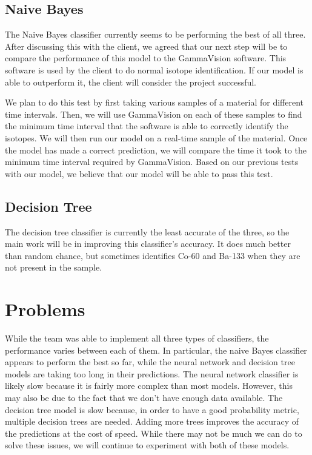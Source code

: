 \documentclass[onecolumn, draftclsnofoot,10pt, compsoc]{IEEEtran}
\begin{document}
\subsection{Naive Bayes}
The Naive Bayes classifier currently seems to be performing the best of all three.
After discussing this with the client, we agreed that our next step will be to compare the performance of this model to the GammaVision software.
This software is used by the client to do normal isotope identification.
If our model is able to outperform it, the client will consider the project successful.

We plan to do this test by first taking various samples of a material for different time intervals.
Then, we will use GammaVision on each of these samples to find the minimum time interval that the software is able to correctly identify the isotopes.
We will then run our model on a real-time sample of the material.
Once the model has made a correct prediction, we will compare the time it took to the minimum time interval required by GammaVision.
Based on our previous tests with our model, we believe that our model will be able to pass this test.

\subsection{Decision Tree}
The decision tree classifier is currently the least accurate of the three, so the main work will be in improving this classifier's accuracy. 
It does much better than random chance, but sometimes identifies Co-60 and Ba-133 when they are not present in the sample.

\section{Problems}
While the team was able to implement all three types of classifiers, the performance varies between each of them.
In particular, the naive Bayes classifier appears to perform the best so far, while the neural network and decision tree models are taking too long in their predictions.
The neural network classifier is likely slow because it is fairly more complex than most models.
However, this may also be due to the fact that we don't have enough data available.
The decision tree model is slow because, in order to have a good probability metric, multiple decision trees are needed.
Adding more trees improves the accuracy of the predictions at the cost of speed.
While there may not be much we can do to solve these issues, we will continue to experiment with both of these models.
\end{document}
